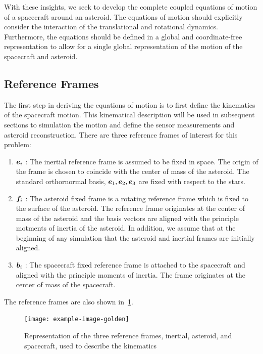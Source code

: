 With these insights, we seek to develop the complete coupled equations of motion of a spacecraft around an asteroid.
The equations of motion should explicitly consider the interaction of the translational and rotational dynamics.
Furthermore, the equations should be defined in a global and coordinate-free representation to allow for a single global representation of the motion of the spacecraft and asteroid.

\subsection{Reference Frames}\label{ssec:dumbbell_eoms_reference_frames}

The first step in deriving the equations of motion is to first define the \gls{kinematics} of the spacecraft motion.
This kinematical description will be used in subsequent sections to simulation the motion and define the sensor measurements and asteroid reconstruction.
There are three reference frames of interest for this problem:
\begin{enumerate}
    \item \( \bm{e}_i \) : The inertial reference frame is assumed to be fixed in space. 
        The origin of the frame is chosen to coincide with the center of mass of the asteroid.
        The standard orthornormal basis, \( \bm{e}_1, \bm{e}_2, \bm{e}_3\) are fixed with respect to the stars.
    \item \( \bm{f}_i \) : The asteroid fixed frame is a rotating reference frame which is fixed to the surface of the asteroid.
        The reference frame originates at the center of mass of the asteroid and the basis vectors are aligned with the principle motments of inertia of the asteroid.
        In addition, we assume that at the beginning of any simulation that the asteroid and inertial frames are initially aligned.
    \item \( \bm{b}_i \) : The spacecraft fixed reference frame is attached to the spacecraft and aligned with the principle moments of inertia.
        The frame originates at the center of mass of the spacecraft.
\end{enumerate}
The reference frames are also shown in~\cref{fig:reference_frames}.
\begin{figure}
    \centering
    \texttt{[image: example-image-golden]}
    \caption{Representation of the three reference frames, inertial, asteroid, and spacecraft, used to describe the kinematics\label{fig:reference_frames}}
\end{figure}

